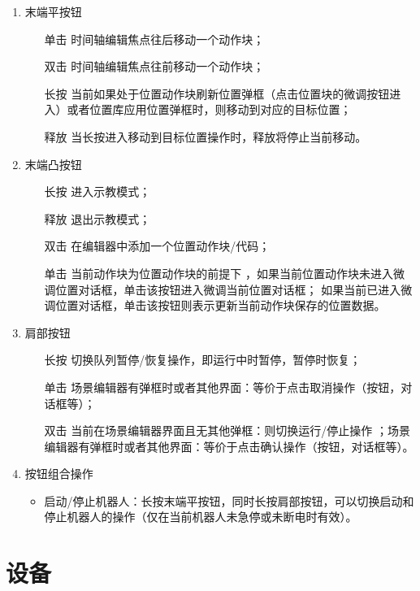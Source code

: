 \begin{enumerate}[label=(\arabic*)]
	\item 末端平按钮
	\begin{itemize}
		\item[单击] 时间轴编辑焦点往后移动一个动作块；
		\item[双击] 时间轴编辑焦点往前移动一个动作块；
		\item[长按] 当前如果处于位置动作块刷新位置弹框（点击位置块的微调按钮进入）或者位置库应用位置弹框时，则移动到对应的目标位置；
		\item[释放] 当长按进入移动到目标位置操作时，释放将停止当前移动。
	\end{itemize}

	\item 末端凸按钮
	\begin{itemize}
		\item[长按] 进入示教模式；
		\item[释放] 退出示教模式；
		\item[双击] 在编辑器中添加一个位置动作块/代码；
		\item[单击] 当前动作块为位置动作块的前提下 ，如果当前位置动作块未进入微调位置对话框，单击该按钮进入微调当前位置对话框； 如果当前已进入微调位置对话框，单击该按钮则表示更新当前动作块保存的位置数据。
	\end{itemize}

	\item 肩部按钮
	\begin{itemize}
		\item[长按] 切换队列暂停/恢复操作，即运行中时暂停，暂停时恢复；
		\item[单击] 场景编辑器有弹框时或者其他界面：等价于点击取消操作（按钮，对话框等）；
		\item[双击] 当前在场景编辑器界面且无其他弹框：则切换运行/停止操作 ；场景编辑器有弹框时或者其他界面：等价于点击确认操作（按钮，对话框等）。
	\end{itemize}

	\item 按钮组合操作
	\begin{itemize}
		\item 启动/停止机器人：长按末端平按钮，同时长按肩部按钮，可以切换启动和停止机器人的操作（仅在当前机器人未急停或未断电时有效）。
	\end{itemize}
\end{enumerate}

\section{设备}
